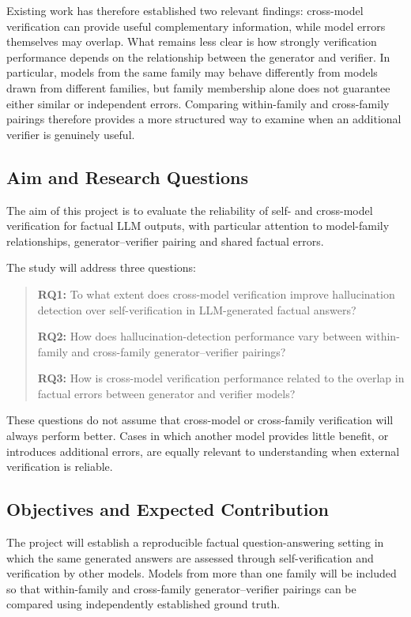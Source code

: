 \documentclass[11pt,a4paper]{article}
\begin{document}
	Existing work has therefore established two relevant findings: cross-model verification can provide useful complementary information, while model errors themselves may overlap. What remains less clear is how strongly verification performance depends on the relationship between the generator and verifier. In particular, models from the same family may behave differently from models drawn from different families, but family membership alone does not guarantee either similar or independent errors. Comparing within-family and cross-family pairings therefore provides a more structured way to examine when an additional verifier is genuinely useful.
	
	\subsection{Aim and Research Questions}
	
	The aim of this project is to evaluate the reliability of self- and cross-model verification for factual LLM outputs, with particular attention to model-family relationships, generator--verifier pairing and shared factual errors.
	
	The study will address three questions:
	
	\begin{quote}
		\textbf{RQ1:} To what extent does cross-model verification improve hallucination detection over self-verification in LLM-generated factual answers?
		
		\textbf{RQ2:} How does hallucination-detection performance vary between within-family and cross-family generator--verifier pairings?
		
		\textbf{RQ3:} How is cross-model verification performance related to the overlap in factual errors between generator and verifier models?
	\end{quote}
	
	These questions do not assume that cross-model or cross-family verification will always perform better. Cases in which another model provides little benefit, or introduces additional errors, are equally relevant to understanding when external verification is reliable.
	
	\subsection{Objectives and Expected Contribution}
	
	The project will establish a reproducible factual question-answering setting in which the same generated answers are assessed through self-verification and verification by other models. Models from more than one family will be included so that within-family and cross-family generator--verifier pairings can be compared using independently established ground truth.
	
\end{document}
